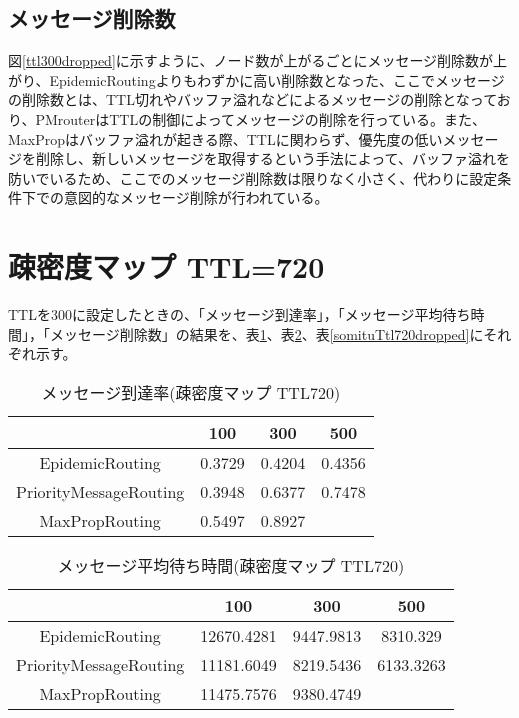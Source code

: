 \documentclass[11pt]{icsthesis}
\begin{document}
\subsection{メッセージ削除数}
図\ref{ttl300dropped}に示すように、ノード数が上がるごとにメッセージ削除数が上がり、EpidemicRoutingよりもわずかに高い削除数となった、ここでメッセージの削除数とは、TTL切れやバッファ溢れなどによるメッセージの削除となっており、PMrouterはTTLの制御によってメッセージの削除を行っている。また、MaxPropはバッファ溢れが起きる際、TTLに関わらず、優先度の低いメッセージを削除し、新しいメッセージを取得するという手法によって、バッファ溢れを防いでいるため、ここでのメッセージ削除数は限りなく小さく、代わりに設定条件下での意図的なメッセージ削除が行われている。

\section{疎密度マップ TTL=720}
TTLを300に設定したときの、「メッセージ到達率」，「メッセージ平均待ち時間」，「メッセージ削除数」の結果を、表\ref{somituTtl720deliveryprob}、表\ref{somituTtl720latencyavg}、表\ref{somituTtl720dropped}にそれぞれ示す。
\begin{table}[H]
 \begin{center}
      \caption[]{メッセージ到達率(疎密度マップ TTL720)}
      \label{somituTtl720deliveryprob}
      \begin{tabular}{|c|c|c|c|}
\hline
&100&300&500\\
\hline
EpidemicRouting&0.3729&0.4204&0.4356\\
\hline
PriorityMessageRouting&0.3948&0.6377&0.7478\\
\hline
MaxPropRouting&0.5497&0.8927&\\
\hline
      \end{tabular}
    \end{center}
\end{table}

\begin{table}[H]
 \begin{center}
      \caption[]{メッセージ平均待ち時間(疎密度マップ TTL720)}
      \label{somituTtl720latencyavg}
      \begin{tabular}{|c|c|c|c|}
\hline
&100&300&500\\
\hline
EpidemicRouting&12670.4281&9447.9813&8310.329\\
\hline
PriorityMessageRouting&11181.6049&8219.5436&6133.3263\\
\hline
MaxPropRouting&11475.7576&9380.4749&\\
\hline
      \end{tabular}
    \end{center}
\end{table}
\end{document}
